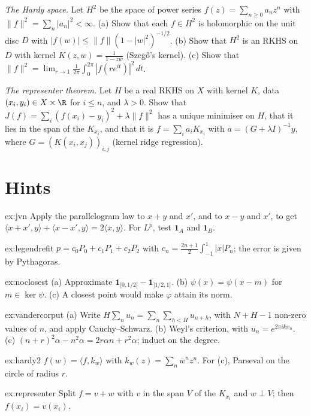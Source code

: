 \begin{exercise}[$\star\star$]\label{ex:hardy2}
\emph{The Hardy space.} Let $H^2$ be the space of power series $f(z)=\sum_{n\ge0}a_nz^n$ with $\|f\|^2=\sum_n|a_n|^2<\infty$. (a) Show that each $f\in H^2$ is holomorphic on the unit disc $D$ with $|f(w)|\le\|f\|(1-|w|^2)^{-1/2}$. (b) Show that
$H^2$ is an RKHS on $D$ with kernel $K(z,w)=\frac1{1-z\overline w}$ (Szeg\H o's kernel). (c) Show that $\|f\|^2=\lim_{r\to1}\frac1{2\pi}\int_0^{2\pi}|f(re^{it})|^2\,dt$.
\end{exercise}

\begin{exercise}[$\star\star$]\label{ex:representer}
\emph{The representer theorem.} Let $H$ be a real RKHS on $X$ with kernel $K$, data $(x_i,y_i)\in X\times\R$ for $i\le n$, and $\lambda>0$. Show that $J(f)=\sum_i(f(x_i)-y_i)^2+\lambda\|f\|^2$ has a unique minimiser on $H$, that it lies in
the span of the $K_{x_i}$, and that it is $f=\sum_ia_iK_{x_i}$ with $a=(G+\lambda I)^{-1}y$, where $G=(K(x_i,x_j))_{i,j}$ (kernel ridge regression).
\end{exercise}

\section{Hints}

\begin{hint}{ex:jvn}
Apply the parallelogram law to $x+y$ and $x'$, and to $x-y$ and $x'$, to get $\langle x+x',y\rangle+\langle x-x',y\rangle=2\langle x,y\rangle$. For $L^p$, test $\mathbf 1_A$ and $\mathbf 1_B$.
\end{hint}
\begin{hint}{ex:legendrefit}
$p=c_0P_0+c_1P_1+c_2P_2$ with $c_n=\frac{2n+1}2\int_{-1}^1|x|P_n$; the error is given by Pythagoras.
\end{hint}
\begin{hint}{ex:noclosest}
(a) Approximate $\mathbf 1_{[0,1/2[}-\mathbf 1_{]1/2,1]}$. (b) $\psi(x)=\psi(x-m)$ for $m\in\ker\psi$. (c) A closest point would make $\varphi$ attain its norm.
\end{hint}
\begin{hint}{ex:vandercorput}
(a) Write $H\sum_nu_n=\sum_n\sum_{h<H}u_{n+h}$, with $N+H-1$ non-zero values of $n$, and apply Cauchy--Schwarz. (b) Weyl's criterion, with $u_n=e^{2\pi ikx_n}$. (c) $(n+r)^2\alpha-n^2\alpha=2r\alpha n+r^2\alpha$; induct on the degree.
\end{hint}
\begin{hint}{ex:hardy2}
$f(w)=\langle f,k_w\rangle$ with $k_w(z)=\sum_n\overline w^nz^n$. For (c), Parseval on the circle of radius $r$.
\end{hint}
\begin{hint}{ex:representer}
Split $f=v+w$ with $v$ in the span $V$ of the $K_{x_i}$ and $w\perp V$; then $f(x_i)=v(x_i)$.
\end{hint}

